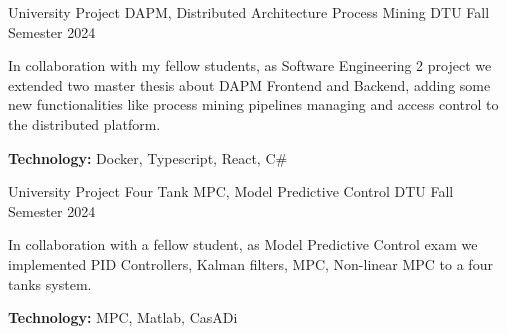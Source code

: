 

\begin{cventries}

  \cventry
    {University Project} %
    {DAPM, Distributed Architecture Process Mining} %
    {DTU} %
    {Fall Semester 2024} %
    {
      \begin{cvitems} %
        \item {In collaboration with my fellow students, as Software Engineering 2 project we extended two master thesis about DAPM Frontend and Backend, adding some new functionalities like process mining pipelines managing and access control to the distributed platform.}
        \item {\textbf{Technology:} Docker, Typescript, React, C\#}
      \end{cvitems}
    }

  \cventry
    {University Project} %
    {Four Tank MPC, Model Predictive Control} %
    {DTU} %
    {Fall Semester 2024} %
    {
      \begin{cvitems} %
        \item {In collaboration with a fellow student, as Model Predictive Control exam we implemented PID Controllers, Kalman filters, MPC, Non-linear MPC to a four tanks system.}
        \item {\textbf{Technology:} MPC, Matlab, CasADi}
      \end{cvitems}
    }


\end{cventries}
